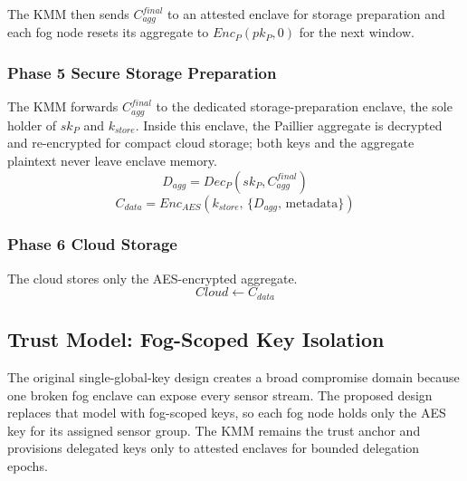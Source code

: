 \documentclass[conference]{IEEEtran}
\begin{document}
    The KMM then sends $C_{agg}^{final}$ to an attested enclave for storage preparation and each fog node resets its aggregate to $Enc_P(pk_P,0)$ for the next window.

    \subsubsection{\textbf{Phase 5 Secure Storage Preparation}}

    The KMM forwards $C_{agg}^{final}$ to the dedicated storage-preparation enclave, the sole holder of $sk_P$ and $k_{store}$. Inside this enclave, the Paillier aggregate is decrypted and re-encrypted for compact cloud storage; both keys and the aggregate plaintext never leave enclave memory.
    \begin{equation}
    D_{agg} = Dec_P(sk_P, C_{agg}^{final})
    \end{equation}
    \begin{equation}
    C_{data} = Enc_{AES}(k_{store},\, \{D_{agg},\, \mathrm{metadata}\})
    \end{equation}
    \subsubsection{\textbf{Phase 6 Cloud Storage}}

    The cloud stores only the AES-encrypted aggregate.
    \begin{equation}
    Cloud \leftarrow C_{data}
    \end{equation}

    \subsection{Trust Model: Fog-Scoped Key Isolation}

    The original single-global-key design creates a broad compromise domain because one broken fog enclave can expose every sensor stream. The proposed design replaces that model with fog-scoped keys, so each fog node holds only the AES key for its assigned sensor group. The KMM remains the trust anchor and provisions delegated keys only to attested enclaves for bounded delegation epochs.
\end{document}
